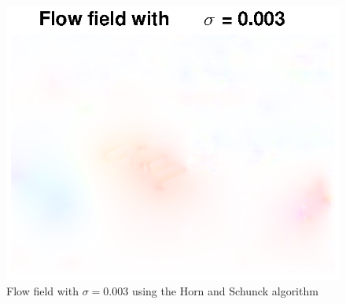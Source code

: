 \documentclass[10pt,a4paper]{article}
\begin{document}
\begin{figure}
    \centering
    \includegraphics[scale=1]{HSregu}
    \caption{Flow field with $\sigma= 0.003$ using the Horn and Schunck algorithm}
    \label{reguHS_best}
\end{figure}
\end{document}
